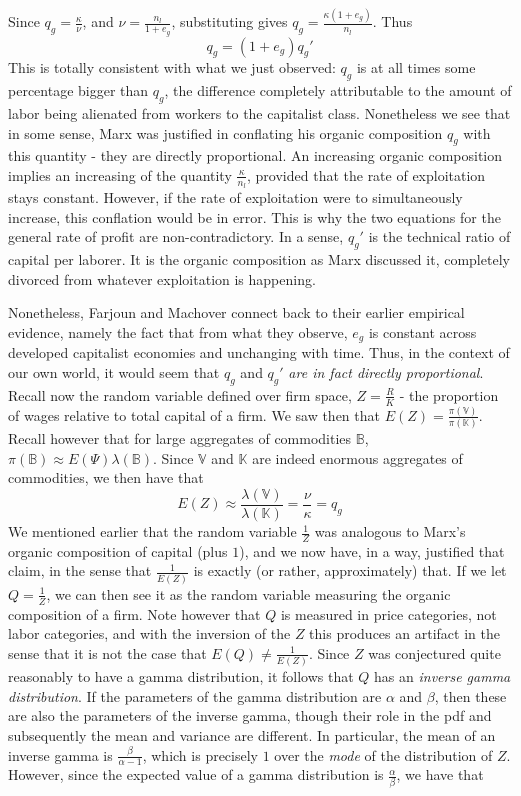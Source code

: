 Since $q_g = \frac{\kappa}{\nu}$, and $\nu = \frac{n_l}{1+e_g}$, substituting gives $q_g = \frac{\kappa(1+e_g)}{n_l}$. Thus
\[ q_g = (1+e_g)q_g' \]
This is totally consistent with what we just observed: $q_g$ is at all times some percentage bigger than $q_g$, the difference completely attributable to the amount of labor being alienated from workers to the capitalist class. Nonetheless we see that in some sense, Marx was justified in conflating his organic composition $q_g$ with this quantity - they are directly proportional. An increasing organic composition implies an increasing of the quantity $\frac{\kappa}{n_l}$, provided that the rate of exploitation stays constant. However, if the rate of exploitation were to simultaneously increase, this conflation would be in error. This is why the two equations for the general rate of profit are non-contradictory. In a sense, $q_g'$ is the technical ratio of capital per laborer. It is the organic composition as Marx discussed it, completely divorced from whatever exploitation is happening. \par
Nonetheless, Farjoun and Machover connect back to their earlier empirical evidence, namely the fact that from what they observe, $e_g$ is constant across developed capitalist economies and unchanging with time. Thus, in the context of our own world, it would seem that $q_g$ and $q_g'$ \textit{are in fact directly proportional}. Recall now the random variable defined over firm space, $Z = \frac{R}{K}$ - the proportion of wages relative to total capital of a firm. We saw then that $E(Z) = \frac{\pi(\mathbb{V})}{\pi(\mathbb{K})}$. Recall however that for large aggregates of commodities $\mathbb{B}$, $\pi(\mathbb{B}) \approx E(\Psi)\lambda(\mathbb{B})$. Since $\mathbb{V}$ and $\mathbb{K}$ are indeed enormous aggregates of commodities, we then have that
\[ E(Z) \approx \frac{\lambda(\mathbb{V})}{\lambda(\mathbb{K})} = \frac{\nu}{\kappa} = q_g \]
We mentioned earlier that the random variable $\frac{1}{Z}$ was analogous to Marx's organic composition of capital (plus $1$), and we now have, in a way, justified that claim, in the sense that $\frac{1}{E(Z)}$ is exactly (or rather, approximately) that. If we let $Q = \frac{1}{Z}$, we can then see it as the random variable measuring the organic composition of a firm. Note however that $Q$ is measured in price categories, not labor categories, and with the inversion of the $Z$ this produces an artifact in the sense that it is not the case that $E(Q) \neq \frac{1}{E(Z)}$. Since $Z$ was conjectured quite reasonably to have a gamma distribution, it follows that $Q$ has an \textit{inverse gamma distribution}. If the parameters of the gamma distribution are $\alpha$ and $\beta$, then these are also the parameters of the inverse gamma, though their role in the pdf and subsequently the mean and variance are different. In particular, the mean of an inverse gamma is $\frac{\beta}{\alpha-1}$, which is precisely $1$ over the \textit{mode} of the distribution of $Z$. However, since the expected value of a gamma distribution is $\frac{\alpha}{\beta}$, we have that
